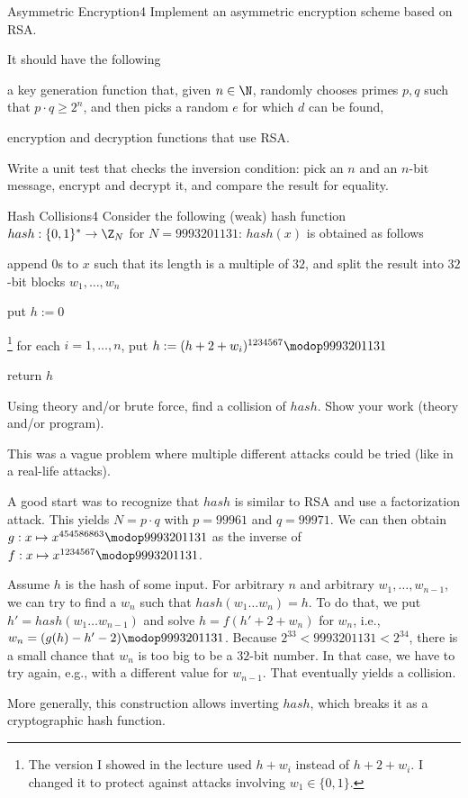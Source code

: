 \documentclass[a4paper]{article}
\begin{document}
\header

\begin{problem}{Asymmetric Encryption}{4}
Implement an asymmetric encryption scheme based on RSA.

It should have the following
\begin{compactitem}
 \item a key generation function that, given $n\in \N$, randomly chooses primes $p,q$ such that $p\cdot q\geq 2^n$, and then picks a random $e$ for which $d$ can be found,
 \item encryption and decryption functions that use RSA.
\end{compactitem}

Write a unit test that checks the inversion condition: pick an $n$ and an $n$-bit message, encrypt and decrypt it, and compare the result for equality.
\end{problem}

\begin{problem}{Hash Collisions}{4}
Consider the following (weak) hash function $hash:\{0,1\}^*\to \Z_N$ for $N=9993201131$: $hash(x)$ is obtained as follows
\begin{compactenum}
 \item append $0$s to $x$ such that its length is a multiple of $32$, and split the result into $32$-bit blocks $w_1,\ldots, w_n$
 \item put $h:=0$
 \item\footnote{The version I showed in the lecture used $h+w_i$ instead of $h+2+w_i$. I changed it to protect against attacks involving $w_1\in\{0,1\}$.}
  for each $i=1,\ldots,n$, put $h:=(h+2+w_i)^{1234567}\modop 9993201131$
 \item return $h$
\end{compactenum}

Using theory and/or brute force, find a collision of $hash$.
Show your work (theory and/or program).

\begin{solution}
This was a vague problem where multiple different attacks could be tried (like in a real-life attacks).

A good start was to recognize that $hash$ is similar to RSA and use a factorization attack.
This yields $N=p\cdot q$ with $p=99961$ and $q=99971$.
We can then obtain $g:x\mapsto x^{454586863}\modop 9993201131$ as the inverse of $f:x\mapsto x^{1234567}\modop 9993201131$.

Assume $h$ is the hash of some input.
For arbitrary $n$ and arbitrary $w_1,\ldots,w_{n-1}$, we can try to find a $w_n$ such that $hash(w_1\ldots w_n)=h$.
To do that, we put $h'=hash(w_1\ldots w_{n-1})$ and solve $h=f(h'+2+w_n)$ for $w_n$, i.e., $w_n=(g(h)-h'-2)\modop 9993201131$.
Because $2^{33}<9993201131<2^{34}$, there is a small chance that $w_n$ is too big to be a $32$-bit number.
In that case, we have to try again, e.g., with a different value for $w_{n-1}$.
That eventually yields a collision.

More generally, this construction allows inverting $hash$, which breaks it as a cryptographic hash function.
\end{solution}
\end{problem}
\end{document}
